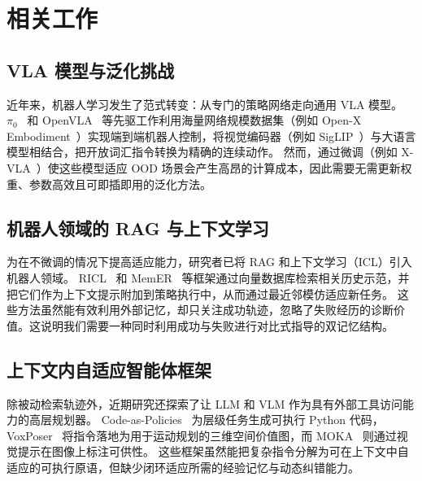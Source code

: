 \section{相关工作}
\label{sec:related_work}

\subsection{VLA 模型与泛化挑战}

近年来，机器人学习发生了范式转变：从专门的策略网络走向通用 VLA 模型。
$\pi_0$~\cite{pi0} 和 OpenVLA~\cite{openvla} 等先驱工作利用海量网络规模数据集（例如 Open-X Embodiment~\cite{openx}）实现端到端机器人控制，将视觉编码器（例如 SigLIP~\cite{siglip}）与大语言模型相结合，把开放词汇指令转换为精确的连续动作。
然而，通过微调（例如 X-VLA~\cite{xvla}）使这些模型适应 OOD 场景会产生高昂的计算成本，因此需要无需更新权重、参数高效且可即插即用的泛化方法。

\subsection{机器人领域的 RAG 与上下文学习}

为在不微调的情况下提高适应能力，研究者已将 RAG 和上下文学习（ICL）引入机器人领域。
RICL~\cite{ricl} 和 MemER~\cite{memer} 等框架通过向量数据库检索相关历史示范，并把它们作为上下文提示附加到策略执行中，从而通过最近邻模仿适应新任务。
这些方法虽然能有效利用外部记忆，却只关注成功轨迹，忽略了失败经历的诊断价值。这说明我们需要一种同时利用成功与失败进行对比式指导的双记忆结构。

\subsection{上下文内自适应智能体框架}

除被动检索轨迹外，近期研究还探索了让 LLM 和 VLM 作为具有外部工具访问能力的高层规划器。
Code-as-Policies~\cite{cap} 为层级任务生成可执行 Python 代码，VoxPoser~\cite{voxposer} 将指令落地为用于运动规划的三维空间价值图，而 MOKA~\cite{moka} 则通过视觉提示在图像上标注可供性。
这些框架虽然能把复杂指令分解为可在上下文中自适应的可执行原语，但缺少闭环适应所需的经验记忆与动态纠错能力。

\endinput
